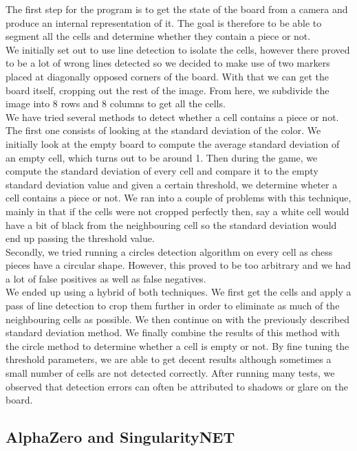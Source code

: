 \documentclass[11pt]{article}
\begin{document}
The first step for the program is to get the state of the board from a camera
and produce an internal representation of it. The goal is therefore to be able
to segment all the cells and determine whether they contain a piece or not.\\ We
initially set out to use line detection to isolate the cells, however there
proved to be a lot of wrong lines detected so we decided to make use of two
markers placed at diagonally opposed corners of the board. With that we can get
the board itself, cropping out the rest of the image. From here, we subdivide
the image into 8 rows and 8 columns to get all the cells.\\ We have tried
several methods to detect whether a cell contains a piece or not. The first one
consists of looking at the standard deviation of the color. We initially look at
the empty board to compute the average standard deviation of an empty cell,
which turns out to be around 1. Then during the game, we compute the standard
deviation of every cell and compare it to the empty standard deviation value and
given a certain threshold, we determine wheter a cell contains a piece or not.
We ran into a couple of problems with this technique, mainly in that if the
cells were not cropped perfectly then, say a white cell would have a bit of
black from the neighbouring cell so the standard deviation would end up passing
the threshold value.\\
Secondly, we tried running a circles detection algorithm on every cell as chess
pieces have a circular shape. However, this proved to be too arbitrary and we
had a lot of false positives as well as false negatives.\\
We ended up using a hybrid of both techniques. We first get the cells and apply
a pass of line detection to crop them further in order to eliminate as much of
the neighbouring cells as possible. We then continue on with the previously
described standard deviation method. We finally combine the results of this
method with the circle method to determine whether a cell is empty or not. By
fine tuning the threshold parameters, we are able to get decent results although
sometimes a small number of cells are not detected correctly. After running many
tests, we observed that detection errors can often be attributed to shadows or
glare on the board.

\subsection{AlphaZero and SingularityNET}
\end{document}
